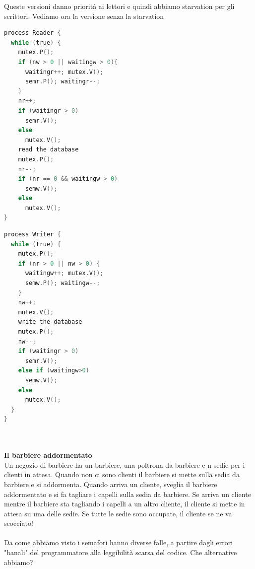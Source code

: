 \documentclass[a4paper,12pt]{article}
\begin{document}
Queste versioni danno priorità ai lettori e quindi abbiamo starvation per gli scrittori. Vediamo ora la versione senza la starvation \\
\begin{minipage}{0.48\textwidth}
\begin{lstlisting}[language=C]
process Reader {
  while (true) {
    mutex.P();
    if (nw > 0 || waitingw > 0){ 
      waitingr++; mutex.V();
      semr.P(); waitingr--;
    }
    nr++;
    if (waitingr > 0)
      semr.V();
    else
      mutex.V();
    read the database
    mutex.P();
    nr--;
    if (nr == 0 && waitingw > 0)
      semw.V();
    else
      mutex.V();
}
\end{lstlisting}
\end{minipage} 
\begin{minipage}{0.48\textwidth}
\begin{lstlisting}[language=C]
process Writer {
  while (true) {
    mutex.P();
    if (nr > 0 || nw > 0) {
      waitingw++; mutex.V();
      semw.P(); waitingw--;
    }
    nw++;
    mutex.V();
    write the database
    mutex.P();
    nw--;
    if (waitingr > 0)
      semr.V();
    else if (waitingw>0)
      semw.V();
    else
      mutex.V();
  }
}
\end{lstlisting}
\end{minipage} \\
\vspace{2em} \\
\textbf{Il barbiere addormentato} \\
Un negozio di barbiere ha un barbiere, una poltrona da barbiere e n sedie per i clienti in attesa. Quando non ci sono clienti il barbiere si mette sulla sedia da barbiere e si addormenta. Quando arriva un cliente, sveglia il barbiere addormentato e si fa tagliare i capelli sulla sedia da barbiere. Se arriva un cliente mentre il barbiere sta tagliando i capelli a un altro cliente, il cliente si mette in attesa su una delle sedie. Se tutte le sedie sono occupate, il cliente se ne va scocciato! \\
\vspace{2em} \\
Da come abbiamo visto i semafori hanno diverse falle, a partire dagli errori "banali" del programmatore alla leggibilità scarsa del codice. Che alternative abbiamo?
\end{document}
